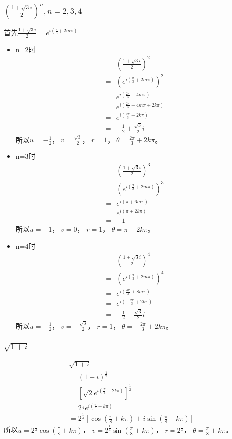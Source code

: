 \documentclass[10pt,a4paper,twocolumn]{ctexart}
\numberwithin{equation}{subsection}
\begin{document}
\subsubsection{$(\frac{1+\sqrt{3} i}{2})^n, n=2, 3, 4$}
首先$\frac{1+\sqrt{3} i}{2} = e^{i(\frac{\pi}{3}+ 2m\pi)}$
\begin{itemize}
	\item n=2时
	\begin{align}
		& \left(\frac{1+\sqrt{3} i}{2}\right)^2 \\
		= & (e^{i(\frac{\pi}{3}+ 2m\pi)})^2 \\
		= & e^{i(\frac{2\pi}{3}+ 4m\pi)} \\		
		= & e^{i(\frac{2\pi}{3}+ 4m\pi + 2k\pi)} \\
		= & e^{i(\frac{2\pi}{3}+ 2k\pi)} \\
		= & -\frac{1}{2}+\frac{\sqrt{3}}{2} i
	\end{align}
	所以$u=-\frac{1}{2}$， $v=\frac{\sqrt{3}}{2}$， $r=1$， $\theta = \frac{2\pi}{3} + 2k\pi$。
	
	
	\item n=3时
	\begin{align}
		& \left(\frac{1+\sqrt{3} i}{2}\right)^3 \\
		= & (e^{i(\frac{\pi}{3}+ 2m\pi)})^3 \\
		= & e^{i(\pi+ 6m\pi)} \\
		= & e^{i(\pi+ 2k\pi)} \\
		= & -1
	\end{align}
	所以$u=-1$， $v=0$， $r=1$， $\theta = \pi+ 2k\pi$。
	
	
	\item n=4时
	\begin{align}
		& \left(\frac{1+\sqrt{3} i}{2}\right)^4 \\
		= & (e^{i(\frac{\pi}{3}+ 2m\pi)})^4 \\
		= & e^{i(\frac{4\pi}{3}+ 8m\pi)} \\		
		= & e^{i(-\frac{2\pi}{3} + 2k\pi)} \\
		= & -\frac{1}{2}-\frac{\sqrt{3}}{2} i 
	\end{align}
	所以$u=-\frac{1}{2}$， $v=-\frac{\sqrt{3}}{2}$， $r=1$， $\theta = -\frac{2\pi}{3} + 2k\pi$。
\end{itemize}

\subsubsection{$\sqrt{1+i}$}
\begin{align}
	& \sqrt{1+i} \\
	& =(1+i)^{\frac{1}{2}}\\
	& =\left[\sqrt{2} e^{i\left(\frac{\pi}{4}+2 k \pi\right)}\right]^{\frac{1}{2}} \\
	& =2^{\frac{1}{4}} e^{i\left(\frac{\pi}{8}+k \pi\right)} \\
	& =2^{\frac{1}{4}}\left[\cos \left(\frac{\pi}{8}+k \pi\right)+i \sin \left(\frac{\pi}{8}+k \pi\right)\right]
\end{align}
所以$u=2^{\frac{1}{4}} \cos \left(\frac{\pi}{8}+k \pi\right)$， $v=2^{\frac{1}{4}} \sin \left(\frac{\pi}{8}+k \pi\right)$， $r=2^{\frac{1}{4}}$， $\theta = \frac{\pi}{8}+k \pi$。
\end{document}
